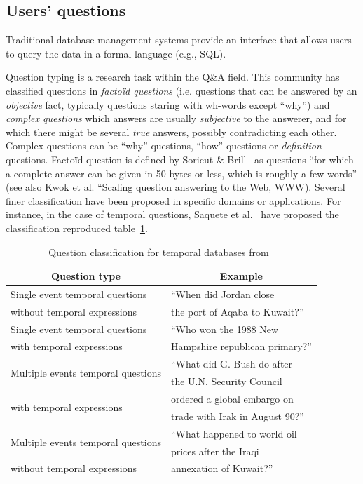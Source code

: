 \documentclass[10pt,journal,letterpaper,compsoc]{IEEEtran}
\newcommand\TODO[1]{{\textcolor{red}{TODO:#1}}}
\begin{document}
\subsection{Users' questions}

\label{sec:big-picture-question}
Traditional database management systems provide an interface that allows users
to query the data in a formal language (e.g., SQL).

Question typing is a research task within the Q\&A field.
This community has classified questions in \emph{facto\"id questions} (i.e.
questions that can be answered by an \emph{objective} fact, typically questions
staring with wh-words except ``why'') and \emph{complex questions} which
answers are usually \emph{subjective} to the answerer, and for which there
might be several \emph{true} answers, possibly contradicting each other.
Complex questions can be ``why''-questions, ``how''-questions or
\emph{definition}-questions.
Facto\"id question is defined by Soricut \&
Brill~\cite{Soricut:2006:AQA:1127331.1127342} as questions ``for which a
complete answer can be given in 50 bytes or less, which is roughly a few
words'' (see also Kwok et al. ``Scaling question answering to the Web, WWW).
Several finer classification have been proposed in specific domains or
applications. 
For instance, in the case of temporal questions, Saquete et
al.~\cite{Saquete:2004:SCT:1218955.1219027} have proposed the classification
reproduced table~\ref{tab:saquete-classification}.
\begin{table}
\centering
\begin{tabular}{ll}\hline
\multicolumn{1}{c}{\textbf{Question type}} &
\multicolumn{1}{c}{\textbf{Example}}\\\hline\hline
Single event temporal questions &
``When did Jordan close \\
 without temporal expressions & the port of Aqaba to Kuwait?''\\\hline 
 Single event temporal questions & 
``Who won the 1988 New \\
 with temporal expressions & Hampshire republican primary?''\\\hline
 \multirow{2}{*}{Multiple events temporal questions} & ``What did G. Bush do
 after\\
  & the U.N. Security Council\\
 \multirow{2}{*}{with temporal expressions} & ordered a global embargo on\\
  & trade with Irak in August 90?''\\\hline
  \multirow{2}{*}{Multiple events temporal questions} & ``What happened to world
  oil\\
   & prices after the Iraqi\\
  without temporal expressions & annexation of Kuwait?''\\\hline
 
\end{tabular}
\caption{Question classification for temporal databases from~\cite{Saquete:2004:SCT:1218955.1219027}}
\label{tab:saquete-classification}
\end{table}
\end{document}
